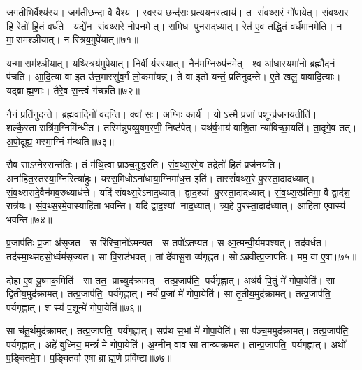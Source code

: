 जग॑तीभि॒र्वैश्य॑स्य। जग॑तीछन्दा॒ वै वैश्य॑। स्वस्य॒ छन्द॑सः प्रत्ययन॒स्त्वाय॑। त सं॑वथ्स॒रं गो॑पायेत्। सं॒व॒थ्स॒र हि रेतो॑ हि॒तं वर्ध॑ते। यद्ये॑न संवथ्स॒रे नोप॒नमेत्। स॒मिध॒ पुन॒राद॑ध्यात्। रेत॑ ए॒व तद्धि॒तं वर्ध॑मानमेति। न मा॒सम॑श्ञीयात्। न स्त्रिय॒मुपे॑यात्॥७१॥

यन्मा॒सम॑श्ञी॒यात्। यथ्स्त्रिय॑मुपे॒यात्। निर्वीर्यस्स्यात्। नैन॑म॒ग्निरुप॑नमेत्। श्व आ॑धा॒स्यमा॑नो ब्रह्मौद॒नं प॑चति। आ॒दि॒त्या वा इ॒त उ॑त्त॒मास्सु॑व॒र्गं लो॒कमा॑यन्न्। ते वा इ॒तो यन्तं॒ प्रति॑नुदन्ते। ए॒ते खलु॒ वावादि॒त्याः। यद्ब्राह्म॒णाः। तैरे॒व स॒न्त्वं ग॑च्छति॥७२॥

नैनं॒ प्रति॑नुदन्ते। ब्र॒ह्म॒वा॒दिनो॑ वदन्ति। क्वा॑ सः। अ॒ग्निः का॒र्य॑। योऽस्मै प्र॒जां प॒शून्प्र॑ज॒नय॒तीति॑। शल्कै॒स्तारात्रि॑म॒ग्निमि॑न्धीत। तस्मि॑न्नुपव्यु॒षम॒रणी॒ निष्ट॑पेत्। यथ॑र्\mbox{}ष॒भाय॑ वाशि॒ता न्या॑विच्छा॒यति॑। ता॒दृगे॒व तत्। अ॒पो॒दूह्य॒ भस्मा॒ग्निं म॑न्थति॥७३॥

सैव साऽग्नेस्सन्त॑तिः। तं म॑थि॒त्वा प्राञ्च॒मुद्ध॑रति। सं॒व॒थ्स॒रमे॒व तद्रेतो॑ हि॒तं प्रज॑नयति। अना॑हित॒स्तस्या॒ग्निरित्या॑हुः। यस्स॒मिधोऽना॑धाया॒ग्निमा॑ध॒त्त इति॑। तास्सं॑वथ्स॒रे पु॒रस्ता॒दाद॑ध्यात्। सं॒व॒थ्सरादे॒वैन॑मव॒रुध्याध॑त्ते। यदि॑ संवथ्स॒रेऽनाद॒ध्यात्। द्वा॒द॒श्यां पु॒रस्ता॒दाद॑ध्यात्। सं॒व॒थ्स॒रप्र॑तिमा॒ वै द्वाद॑श॒ रात्र॑यः। सं॒व॒थ्स॒रमे॒वास्याहि॑ता भवन्ति। यदि॑ द्वाद॒श्यां नाद॒ध्यात्। त्र्य॒हे पु॒रस्ता॒दाद॑ध्यात्। आहि॑ता ए॒वास्य॑ भवन्ति॥७४॥

प्र॒जाप॑तिः प्र॒जा अ॑सृजत। स रि॑रिचा॒नो॑ऽमन्यत। स तपो॑ऽतप्यत। स आ॒त्मन्वी॒र्य॑मपश्यत्। तद॑वर्धत। तद॑स्मा॒थ्सह॑सो॒र्ध्वम॑सृज्यत। सा वि॒राड॑भवत्। तां दे॑वासु॒रा व्य॑गृह्णत। सोऽब्रवीत्प्र॒जाप॑तिः। मम॒ वा ए॒षा॥७५॥

दोहा॑ ए॒व यु॒ष्माक॒मिति॑। सा तत॒ प्राच्युद॑क्रामत्। तत्प्र॒जाप॑ति॒ पर्य॑गृह्णात्। अथ॑र्व पि॒तुं मे॑ गोपा॒येति॑। सा द्वि॒तीय॒मुद॑क्रामत्। तत्प्र॒जाप॑ति॒ पर्य॑गृह्णात्। नर्य॑ प्र॒जां मे॑ गोपा॒येति॑। सा तृ॒तीय॒मुद॑क्रामत्। तत्प्र॒जाप॑ति॒ पर्य॑गृह्णात्। शस्य॑ प॒शून्मे॑ गोपा॒येति॑॥७६॥

सा च॑तु॒र्थमुद॑क्रामत्। तत्प्र॒जाप॑ति॒ पर्य॑गृह्णात्। सप्र॑थ स॒भां मे॑ गोपा॒येति॑। सा प॑ञ्च॒ममुद॑क्रामत्। तत्प्र॒जाप॑ति॒ पर्य॑गृह्णात्। अहे॑ बुध्निय॒ मन्त्रं॑ मे गोपा॒येति॑। अ॒ग्नीन् वाव सा तान्व्य॑क्रमत। तान्प्र॒जाप॑ति॒ पर्य॑गृह्णात्। अथो॑ प॒ङ्क्तिमे॒व। प॒ङ्क्तिर्वा ए॒षा ब्राह्म॒णे प्रवि॑ष्टा॥७७॥

